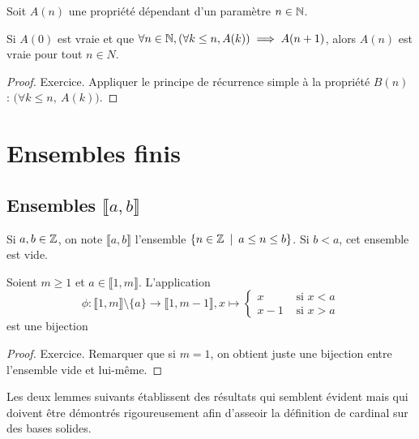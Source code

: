 \begin{theoreme}
Soit $A(n)$ une propriété dépendant d'un paramètre $n\in \mathbb{N}$. 

Si $A(0)$ est vraie et que $\forall n\in \mathbb{N}, (\forall k\leq n, A(k))\implies A(n+1)$, alors $A(n)$ est vraie pour tout $n\in N$.
\end{theoreme}
\begin{proof}
Exercice. Appliquer le principe de  récurrence simple à la propriété $B(n)$ : \og $\big(\forall k\leq n,\: A(k)\big)$\fg.
\end{proof}
\section{Ensembles finis}

\subsection{Ensembles $\llbracket a,b\rrbracket$}

Si $a, b\in \mathbb{Z}$, on note $\llbracket a,b\rrbracket$ l'ensemble $\{n\in \Z\:\mid\: a\leq n \leq b\}$. Si $b<a$, cet ensemble est vide.

\begin{lemme} Soient $m\geq 1$ et $a\in \llbracket 1,m\rrbracket$. L'application 
\[
\phi : \llbracket 1,m\rrbracket \setminus \{a\} \to \llbracket 1,m-1\rrbracket, 
x\mapsto \begin{cases}x & \text{ si }x<a\\x-1 & \text{ si }x>a\end{cases}
\]
est une bijection
\end{lemme}
\begin{proof} Exercice. Remarquer que si $m=1$, on obtient juste une bijection entre l'ensemble vide et lui-même.
\end{proof}


Les deux lemmes suivants établissent des résultats qui semblent \og évident\fg{} mais qui doivent être démontrés rigoureusement afin d'asseoir la définition de cardinal sur des bases solides.

